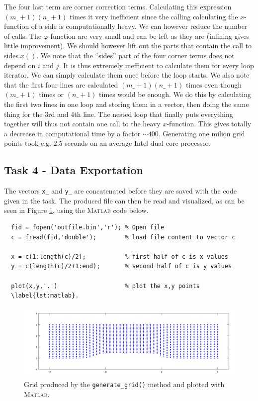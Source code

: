 \documentclass[paper=a4, fontsize=12pt]{article} %
\begin{document}
The four last term are corner correction terms. Calculating this expression $(m\_+1)(n\_+1)$ times it very inefficient since the calling calculating the $x$-function of a side is computationally heavy. We can however reduce the number of calls. The $\varphi$-function are very small and can be left as they are (inlining gives little improvement). We should however lift out the parts that contain the call to sides.$x()$. We note that the ``sides'' part of the four corner terms does not depend on $i$ and $j$. It is thus extremely inefficient to calculate them for every loop iterator. We can simply calculate them once before the loop starts. We also note that the first four lines are calculated $(m\_+1)(n\_+1)$ times even though $(m\_+1)$ times or $(n\_+1)$ times would be enough. We do this by calculating the first two lines in one loop and storing them in a vector, then doing the same thing for the 3rd and 4th line. The nested loop that finally puts everything together will thus not contain one call to the heavy $x$-function. This gives totally a decrease in computational time by a factor $\sim 400$. Generating one milion grid points took e.g. $2.5$ seconds on an average Intel dual core processor.  \\

\subsection*{Task 4 - Data Exportation}

The vectors \texttt{x\_} and \texttt{y\_} are concatenated before they are saved with
the code given in the task. The produced file can then be read and
visualized, as can be seen in Figure \ref{fig:grid}, using
the \textsc{Matlab} code below.

\begin{lstlisting}
  fid = fopen('outfile.bin','r'); % Open file
  c = fread(fid,'double');        % load file content to vector c

  x = c(1:length(c)/2);           % first half of c is x values
  y = c(length(c)/2+1:end);       % second half of c is y values

  plot(x,y,'.')                   % plot the x,y points
  \label{lst:matlab}.
\end{lstlisting}

\begin{figure}[H]
  \centering
  \includegraphics[width=\textwidth]{task4.pdf}
  \caption{Grid produced by the \texttt{generate\_grid()} method and plotted with \textsc{Matlab.}\label{fig:grid}}
\end{figure}
\end{document}
